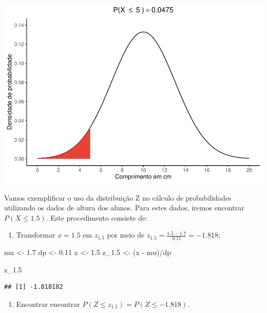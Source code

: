\documentclass[
]{book}
\newenvironment{Shaded}{\begin{snugshade}}{\end{snugshade}}
\newcommand{\FloatTok}[1]{\textcolor[rgb]{0.00,0.00,0.81}{#1}}
\newcommand{\NormalTok}[1]{#1}
\newcommand{\OtherTok}[1]{\textcolor[rgb]{0.56,0.35,0.01}{#1}}
\newcommand{\SpecialCharTok}[1]{\textcolor[rgb]{0.00,0.00,0.00}{#1}}
\providecommand{\tightlist}{%
  \setlength{\itemsep}{0pt}\setlength{\parskip}{0pt}}
\begin{document}
\begin{center}\includegraphics{probest-cambientais_files/figure-latex/unnamed-chunk-78-1} \end{center}

Vamos exemplificar o uso da distribuição Z no cálculo de probabilidades utilizando os dados de altura dos alunos. Para estes dados, iremos encontrar \(P(X \le 1.5)\). Este procedimento consiste de:

\begin{enumerate}
\def\labelenumi{\arabic{enumi}.}
\tightlist
\item
  Transformar \(x = 1.5\) em \(z_{1.5}\) por meio de \(z_{1.5} = \frac{1.5 - 1.7}{0.11} = -1.818\);
\end{enumerate}

\begin{Shaded}
\begin{Highlighting}[]
\NormalTok{mu }\OtherTok{\textless{}{-}} \FloatTok{1.7}
\NormalTok{dp }\OtherTok{\textless{}{-}} \FloatTok{0.11}
\NormalTok{x }\OtherTok{\textless{}{-}} \FloatTok{1.5}
\NormalTok{z\_1}\FloatTok{.5} \OtherTok{\textless{}{-}}\NormalTok{ (x }\SpecialCharTok{{-}}\NormalTok{ mu)}\SpecialCharTok{/}\NormalTok{dp}

\NormalTok{z\_1}\FloatTok{.5}
\end{Highlighting}
\end{Shaded}

\begin{verbatim}
## [1] -1.818182
\end{verbatim}

\begin{enumerate}
\def\labelenumi{\arabic{enumi}.}
\setcounter{enumi}{1}
\tightlist
\item
  Encontrar encontrar \(P(Z \le z_{1.5}) = P(Z \le -1.818)\).
\end{enumerate}
\end{document}
